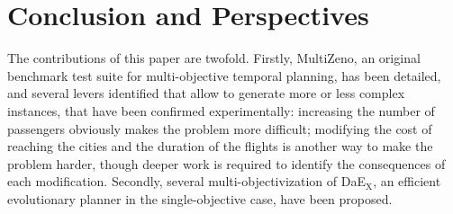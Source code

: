 \documentclass{llncs}
\def\DAEX{{\sc DaE$_{\text{X}}$}}
\def\MULTIZENO{{\sc MultiZeno}}
\begin{document}
% 
% 
%  



\section{Conclusion and Perspectives}
\label{sec:conclusion}
The contributions of this paper are twofold. Firstly, \MULTIZENO, an original benchmark test suite for multi-objective temporal planning, has been detailed, and several levers identified that allow to generate more or less complex instances, that have been confirmed experimentally: increasing the number of passengers obviously makes the problem more difficult; modifying the cost of reaching the cities and the duration of the flights is another way to make the problem harder, though deeper work is required to identify the consequences of each modification.
Secondly, several multi-objectivization of \DAEX, an efficient evolutionary planner in the single-objective case, have been proposed.
\end{document}
